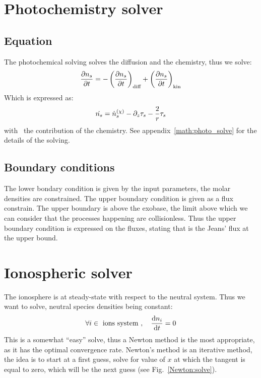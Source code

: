 \section{Photochemistry solver}

\subsection{Equation}

The photochemical solving solves the diffusion and the chemistry, thus we solve:
\begin{equation}
\frac{\partial n_s}{\partial t} = - \left(\frac{\partial n_s}{\partial t}\right)_\text{diff} + \left(\frac{\partial n_s}{\partial t}\right)_\text{kin}
\end{equation}
Which is expressed as:
\begin{equation}
\dot{n_s} = \dot{n}^{(\chi)}_s - \partial_{z}{\tau_s} - \frac{2}{r}\tau_s
\label{Titan:photochem_eq}
\end{equation}
with \omegadot\ the contribution of the chemistry.
See appendix~\ref{math:photo_solve} for the details of the solving.

\subsection{Boundary conditions}

The lower bondary condition is given by the input parameters, the molar densities
are constrained. The upper boundary condition is given as a flux constrain. The
upper boundary is above the exobase, the limit above which we can consider that
the processes happening are collisionless. Thus the upper boundary condition
is expressed on the fluxes, stating that \doverdz{\conc} is the Jeans' flux
at the upper bound.

\section{Ionospheric solver}

The ionosphere is at steady-state with respect to the
neutral system. Thus we want to solve, neutral species
densities being constant:
\begin{equation}
\forall i \in \text{ ions system },\quad \frac{\mathrm{d} n_i}{\mathrm{d} t} = 0
\label{ionosphere:steady_state}
\end{equation}
%
This is a somewhat ``easy'' solve, thus a Newton method is the
most appropriate, as it has the optimal convergence rate.
Newton's method is an iterative method, the idea is to start
at a first guess, solve for value of $x$ at which the tangent is
equal to zero, which will be the next guess (see Fig.~\ref{Newton:solve}).

